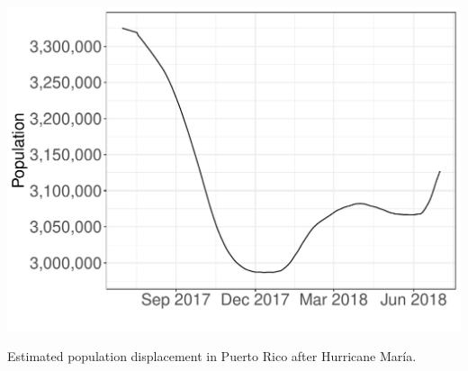 \documentclass[11pt]{article}
\begin{document}
\begin{suppfigure}[ht]
	\centering
	\includegraphics[width=1\linewidth]{figs/supp-figure-8.pdf} 
	\caption{Estimated population displacement in Puerto Rico after Hurricane Mar\'ia.}
	\label{supp-fig:pop-displacement-pr}
\end{suppfigure}
\end{document}
